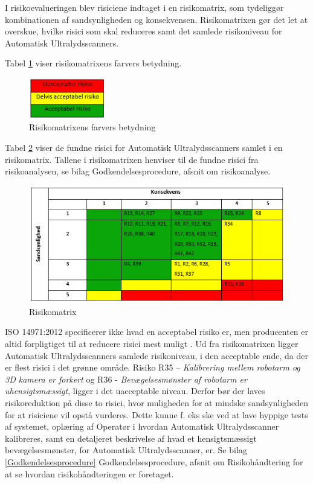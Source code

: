 I risikoevalueringen blev risiciene indtaget i en risikomatrix, som tydeliggør kombinationen af sandsynligheden og konsekvensen. Risikomatrixen gør det let at overskue, hvilke risici som skal reduceres samt det samlede risikoniveau for Automatisk Ultralydsscanners.  

Tabel \ref{Niveau} viser risikomatrixens farvers betydning. 

\begin{figure}[H]
    \centering
    \includegraphics[width=0.30\textwidth]{figurer/r/Niveau}
    \caption{Risikomatrixens farvers betydning}
    \label{Niveau}
\end{figure}

Tabel \ref{Risiko} viser de fundne risici for Automatisk Ultralydsscanners samlet i en risikomatrix. Tallene i risikomatrixen henviser til de fundne risici fra risikoanalysen, se bilag \citep{Godkendelsesprocedure} Godkendelsesprocedure, afsnit om risikoanalyse.  

\begin{figure}[H]
    \centering
    \includegraphics[width=1\textwidth]{figurer/r/Risiko}
    \caption{Risikomatrix}
    \label{Risiko}
\end{figure}

ISO 14971:2012 specificerer ikke hvad en acceptabel risiko er, men producenten er altid forpligtiget til at reducere risici mest muligt \cite{14971}. Ud fra risikomatrixen ligger Automatisk Ultralydsscanners samlede risikoniveau, i den acceptable ende, da der er flest risici i det grønne område. Risiko R35 – \textit{Kalibrering mellem robotarm og 3D kamera er forkert} og R36 - \textit{Bevægelsesmønster af robotarm er uhensigtsmæssigt}, ligger i det uacceptable niveau. Derfor bør der laves risikoreduktion på disse to risici, hvor muligheden for at mindske sandsynligheden for at risiciene vil opstå vurderes. Dette kunne f. eks ske ved at lave hyppige tests af systemet, oplæring af Operatør i hvordan Automatisk Ultralydsscanner kalibreres, samt en detaljeret beskrivelse af hvad et hensigtsmæssigt bevægelsesmønster, for Automatisk Ultralydsscanner, er. Se bilag \ref{Godkendelsesprocedure} Godkendelsesprocedure, afsnit om Risikohåndtering for at se hvordan risikohåndteringen er foretaget. 

